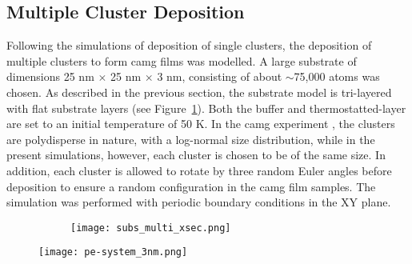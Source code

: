 \subsection{Multiple Cluster Deposition}
\begin{changebar}
Following the simulations of deposition of single clusters, the deposition of multiple clusters to form \gls{camg} films was modelled. A large \cz  substrate of dimensions 25 nm $\times$ 25 nm $\times$ 3 nm, consisting of about $\sim$75,000 atoms was chosen. As described in the previous section, the substrate model is tri-layered with flat substrate layers (see Figure~\ref{f:cibdmmod}). Both the buffer and thermostatted-layer are set to an initial temperature of 50 K. %
In the \gls{camg} experiment \cite{Benel2019}, the clusters are polydisperse in nature, with a log-normal size distribution, while in the present simulations, however, each cluster is chosen to be of the same size. In addition, each cluster is allowed to rotate by three random Euler angles before deposition to ensure a random configuration in the \gls{camg} film samples. The simulation was performed with periodic boundary conditions in the XY plane. \par

\begin{figure}[h]
	\begin{subfigure}{\textwidth}
		\texttt{[image: subs\_multi\_xsec.png]}
	\end{subfigure}
	\label{f:cibdmmod}
\end{figure}

\begin{figure}[h] \centering \texttt{[image: pe-system\_3nm.png]}
	\label{f:multiconverge}
\end{figure}%
\end{changebar}

